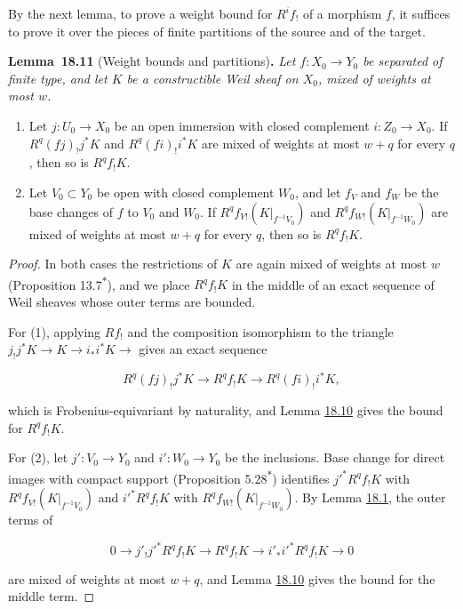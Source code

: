 \documentclass[11pt]{article}
\newenvironment{bpstatement}[2]{\par\addvspace{0.6\baselineskip}\noindent\textbf{#1}#2\textbf{.}\enspace\ignorespaces}
  {\par\addvspace{0.4\baselineskip}}
\newenvironment{bpstatementit}[2]{\begin{bpstatement}{#1}{#2}\itshape\ignorespaces}{\end{bpstatement}}
\newcommand{\bpout}[1]{#1\textsuperscript{\hyperlink{bp-outside}{\ensuremath{\ast}}}}
\begin{document}
\label{bp35}%
By the next lemma, to prove a weight bound for \(R^if_!\) of a morphism \(f\), it suffices to prove it over the pieces of finite partitions of the source and of the target.

\label{bp36}%
\begin{bpstatementit}{Lemma~18.11}{ (Weight bounds and partitions)}
Let \(f:X_0\to Y_0\) be separated of finite type, and let \(K\) be a constructible Weil sheaf on \(X_0\), mixed of weights at most \(w\).

\begin{enumerate}
\item Let \(j:U_0\to X_0\) be an open immersion with closed complement \(i:Z_0\to X_0\). If \(R^q(fj)_!j^*K\) and \(R^q(fi)_!i^*K\) are mixed of weights at most \(w+q\) for every \(q\), then so is \(R^qf_!K\).
\item Let \(V_0\subset Y_0\) be open with closed complement \(W_0\), and let \(f_V\) and \(f_W\) be the base changes of \(f\) to \(V_0\) and \(W_0\). If \(R^qf_{V!}(K|_{f^{-1}V_0})\) and \(R^qf_{W!}(K|_{f^{-1}W_0})\) are mixed of weights at most \(w+q\) for every \(q\), then so is \(R^qf_!K\).
\end{enumerate}
\end{bpstatementit}

\begin{proof}[{Proof}]\label{bp37}%
In both cases the restrictions of \(K\) are again mixed of weights at most \(w\) (Proposition \bpout{13.7}), and we place \(R^qf_!K\) in the middle of an exact sequence of Weil sheaves whose outer terms are bounded.

For (1), applying \(Rf_!\) and the composition isomorphism to the triangle \(j_!j^*K\to K\to i_*i^*K\to\) gives an exact sequence

\[
R^q(fj)_!j^*K\longrightarrow R^qf_!K\longrightarrow R^q(fi)_!i^*K,
\]

which is Frobenius-equivariant by naturality, and Lemma \hyperref[bp33]{18.10} gives the bound for \(R^qf_!K\).

For (2), let \(j':V_0\to Y_0\) and \(i':W_0\to Y_0\) be the inclusions. Base change for direct images with compact support (Proposition \bpout{5.28}) identifies \(j'^*R^qf_!K\) with \(R^qf_{V!}(K|_{f^{-1}V_0})\) and \(i'^*R^qf_!K\) with \(R^qf_{W!}(K|_{f^{-1}W_0})\). By Lemma \hyperref[bp5]{18.1}, the outer terms of

\[
0\longrightarrow j'_!j'^*R^qf_!K\longrightarrow R^qf_!K
\longrightarrow i'_*i'^*R^qf_!K\longrightarrow0
\]

are mixed of weights at most \(w+q\), and Lemma \hyperref[bp33]{18.10} gives the bound for the middle term.
\end{proof}
\end{document}
